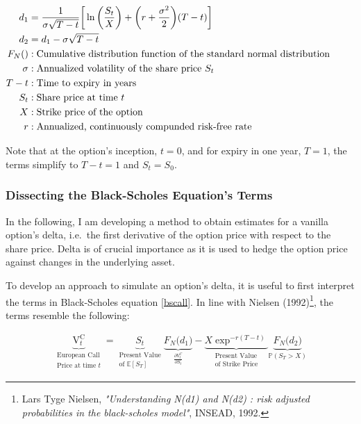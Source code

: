 \documentclass[
  12pt,
]{article}
\begin{document}
\(\begin{aligned} d_1 &= \frac{1}{\sigma\sqrt{T-t}}\bigg[\ln\bigg(\frac{S_t}{X}\bigg)+\bigg(r + \frac{\sigma^2}{2}\bigg)(T-t) \bigg] \notag\\ \vspace{2mm} d_2 &= d_1 - \sigma\sqrt{T-t} \notag\\ \vspace{2mm} F_N() &: \text{Cumulative distribution function of the standard normal distribution} \notag\\ \sigma &: \text{Annualized volatility of the share price } S_t \notag\\ T-t &: \text{Time to expiry in years} \notag\\ S_t &: \text{Share price at time } t \notag\\ X &: \text{Strike price of the option} \notag\\ r &: \text{Annualized, continuously compunded risk-free rate} \notag \end{aligned}\)

\normalsize
\vspace{2mm}

Note that at the option's inception, \(t=0\), and for expiry in one
year, \(T=1\), the terms simplify to \(T-t = 1\) and \(S_t = S_0\).

\hypertarget{dissecting-the-black-scholes-equations-terms}{%
\subsubsection{Dissecting the Black-Scholes Equation's
Terms}\label{dissecting-the-black-scholes-equations-terms}}

In the following, I am developing a method to obtain estimates for a
vanilla option's delta, i.e.~the first derivative of the option price
with respect to the share price. Delta is of crucial importance as it is
used to hedge the option price against changes in the underlying asset.

To develop an approach to simulate an option's delta, it is useful to
first interpret the terms in Black-Scholes equation \eqref{bscall}. In
line with Nielsen (1992)\footnote{Lars Tyge Nielsen,
  \textit{"Understanding N(d1) and N(d2) : risk adjusted probabilities in the black-scholes model"},
  INSEAD, 1992.}, the terms resemble the following:

\begin{align}
\underbrace{\text{V}^{\text{C}}_t}_{\substack{\text{European Call}\\  \text{Price at time }t}} = \underbrace{S_t}_{\substack{\text{Present Value}\\  \text{of }\mathbb E[S_T]}}\underbrace{F_N \big(d_1\big)}_{\frac{\partial V^C_{t}}{\partial S_t}} - \underbrace{X \exp^{-r(T-t)}}_{\substack{\text{Present Value}\\  \text{of Strike Price}}} \underbrace{F_N \big(d_2\big)}_{\mathbb{P}(S_T>X)} \label{bscall2}
\end{align}
\end{document}
